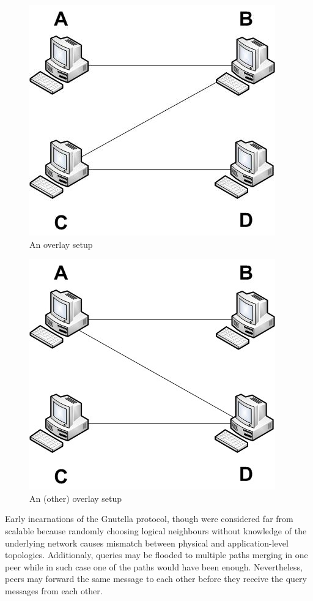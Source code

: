 \documentclass[a4paper,10pt]{article}
\begin{document}
\begin{figure}
\centering
  \includegraphics[scale=0.4]{img/over1.jpeg}
\caption{An overlay setup}
\label{figure:over1}
\end{figure}

\begin{figure}
\centering
  \includegraphics[scale=0.4]{img/over2.jpeg}
\caption{An (other) overlay setup}
\label{figure:over2}
\end{figure}

Early incarnations of the Gnutella protocol, though were considered far from scalable \cite{ritter_gnucantscale_2001} because randomly choosing logical neighbours without knowledge of the underlying network causes mismatch between physical and application-level topologies. Additionaly, queries may be flooded to multiple paths merging in one peer while in such case one of the paths would have been enough. Nevertheless, peers may forward the same message to each other before they receive the query messages from each other.
\end{document}
